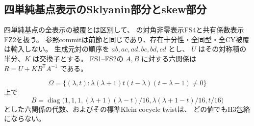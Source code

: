 \subsection{四単純基点表示のSklyanin部分とskew部分}
\label{subsec:cubic-as4-four-simple}
四単純基点の全表示の被覆とは区別して、
\cite{AS4lowpinned}の対角非零表示FS4と共有係数表示FZ2を扱う。
参照commitは前節と同じであり、存在十分性・全同型・全CY被覆は輸入しない。
生成元対の順序を $ab,ac,ad,bc,bd,cd$ とし、
$U$ はその対称積の半分、$K$ は交換子とする。
FS1--FS2の $A,B$ に対する六関係は $R=U+KB^{\mathsf T}A^{-1}$ である。

\begin{proposition}\label{prop:cubic-fs-sklyanin}
\[
 \Omega=\{(\lambda,t):\lambda(\lambda+1)t(t-\lambda)(t-\lambda-1)\ne0\}
\]
上で
\[
 B=\operatorname{diag}\bigl(1,1,1,
 (\lambda+1)(\lambda-t)/16,
 \lambda(\lambda+1-t)/16,t/16\bigr)
\]
とした六関係の代数、およびその標準Klein cocycle twistは、
どの値でもH3包絡にならない。
\end{proposition}
